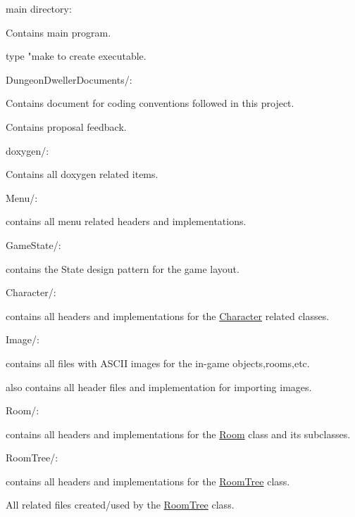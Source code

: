 main directory\-:
\begin{DoxyItemize}
\item Contains main program.
\item type "make to create executable.
\end{DoxyItemize}

Dungeon\-Dweller\-Documents/\-:
\begin{DoxyItemize}
\item Contains document for coding conventions followed in this project.
\item Contains proposal feedback.
\end{DoxyItemize}

doxygen/\-:
\begin{DoxyItemize}
\item Contains all doxygen related items.
\end{DoxyItemize}

Menu/\-:
\begin{DoxyItemize}
\item contains all menu related headers and implementations.
\end{DoxyItemize}

Game\-State/\-:
\begin{DoxyItemize}
\item contains the State design pattern for the game layout.
\end{DoxyItemize}

Character/\-:
\begin{DoxyItemize}
\item contains all headers and implementations for the \hyperlink{classCharacter}{Character} related classes.
\end{DoxyItemize}

Image/\-:
\begin{DoxyItemize}
\item contains all files with A\-S\-C\-I\-I images for the in-\/game objects,rooms,etc.
\item also contains all header files and implementation for importing images.
\end{DoxyItemize}

Room/\-:
\begin{DoxyItemize}
\item contains all headers and implementations for the \hyperlink{classRoom}{Room} class and its subclasses.
\end{DoxyItemize}

Room\-Tree/\-:
\begin{DoxyItemize}
\item contains all headers and implementations for the \hyperlink{classRoomTree}{Room\-Tree} class.
\item All related files created/used by the \hyperlink{classRoomTree}{Room\-Tree} class.
\end{DoxyItemize}

